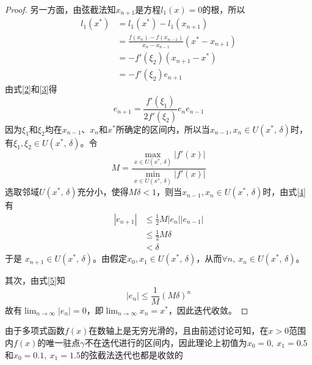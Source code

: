 \documentclass[11pt]{article}
\begin{document}
\begin{proof}
    另一方面，由弦截法知$x_{n + 1}$是方程$l_1(x) = 0$的根，所以
    \begin{align*}
        l_1(x^*) & = l_1(x^*) - l_1(x_{n + 1})                                      \\
                 & = \frac{f(x_n) - f(x_{n - 1})}{x_n - x_{n - 1}}(x^* - x_{n + 1}) \\
                 & = -f'(\xi_2)(x_{n + 1} - x^*)                                    \\
                 & = -f'(\xi_2)e_{n + 1} \label{3} \tag{3}
    \end{align*}
    由式\eqref{2}和\eqref{3}得
    \begin{equation}
        e_{n + 1} = \frac{f'(\xi_1)}{2f'(\xi_2)}e_ne_{n - 1} \label{4} \tag{4}
    \end{equation}
    因为$\xi_1$和$\xi_2$均在$x_{n - 1}$、$x_n$和$x^*$所确定的区间内，所以当$x_{n - 1}, x_n \in U(x^*,\, \delta)$时，有$\xi_1, \xi_2 \in U(x^*,\, \delta)$。令
    \begin{equation*}
        M = \frac{\displaystyle \max_{x \in U(x^*,\, \delta)}{\left|f'(x)\right|}}{\displaystyle \min_{x \in U(x^*,\, \delta)}{\left|f'(x)\right|}}
    \end{equation*}
    选取邻域$U(x^*,\, \delta)$充分小，使得$M\delta < 1$，则当$x_{n - 1}, x_n \in U(x^*,\, \delta)$时，由式\eqref{4}有
    \begin{align*}
        \left|e_{n + 1}\right| & \leqslant \frac{1}{2}M\left|e_{n}\right|\left|e_{n - 1}\right| \\
                               & \leqslant \frac{1}{2}M\delta                                   \\
                               & < \delta \label{5} \tag{5}
    \end{align*}
    于是 $x_{n + 1} \in U(x^*,\, \delta)$。由假定$x_0, x_1 \in U(x^*,\, \delta)$，从而$\forall n,\ x_n \in U(x^*,\, \delta)$。

    其次，由式\eqref{5}知
    \begin{equation*}
        \left|e_{n}\right| \leqslant \frac{1}{M}(M\delta)^n
    \end{equation*}
    故有$\displaystyle \lim_{n \rightarrow \infty}{\left|e_{n}\right|} = 0$，即$\displaystyle \lim_{n \rightarrow \infty}{x_n} = x^*$，因此迭代收敛。
\end{proof}
由于多项式函数$f(x)$在数轴上是无穷光滑的，且由前述讨论可知，在$x > 0$范围内$f(x)$的唯一驻点$\gamma$不在迭代进行的区间内，因此理论上初值为$x_0 = 0,\ x_1 = 0.5$和$x_0 = 0.1,\ x_1 = 1.5$的弦截法迭代也都是收敛的
\end{document}
